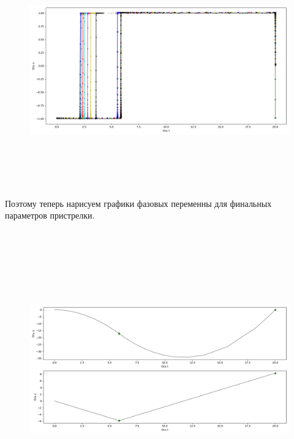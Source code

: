 \documentclass[a4paper,12pt]{article}
\begin{document}
\begin{figure}[H]
    \centering
      \includegraphics[width=\textwidth, height=10cm]{Figure2_3.png}
\end{figure}
Поэтому теперь нарисуем графики фазовых переменны для финальных параметров пристрелки.
\begin{figure}[H]
    \centering
      \includegraphics[width=\textwidth, height=12cm]{Figure4_1.png}
\end{figure}
\end{document}
